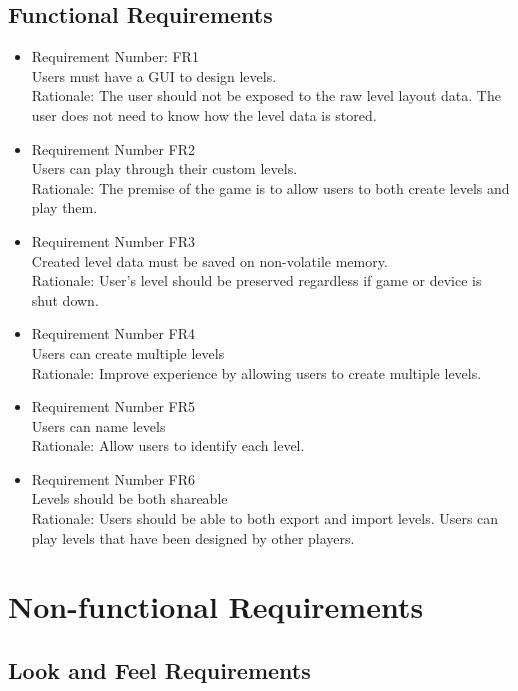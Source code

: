 \documentclass[12pt, titlepage]{article}
\begin{document}
\subsection{Functional Requirements}
\begin{itemize}
    \item Requirement Number: FR1\\
    Users must have a GUI to design levels.\\
    Rationale: The user should not be exposed to the raw level layout data. The user does not need to know how the level data is stored.
    \item Requirement Number FR2\\
    Users can play through their custom levels.\\
    Rationale: The premise of the game is to allow users to both create levels and play them.
    \item Requirement Number FR3\\
    Created level data must be saved on non-volatile memory.\\
    Rationale: User's level should be preserved regardless if game or device is shut down.
    \item Requirement Number FR4\\
    Users can create multiple levels\\
    Rationale: Improve experience by allowing users to create multiple levels.
    \item Requirement Number FR5\\
    Users can name levels\\
    Rationale: Allow users to identify each level.
    \item Requirement Number FR6\\
    Levels should be both shareable\\
    Rationale: Users should be able to both export and import levels. Users can play levels that have been designed by other players.
\end{itemize}

\section{Non-functional Requirements}

\subsection{Look and Feel Requirements}
\end{document}
